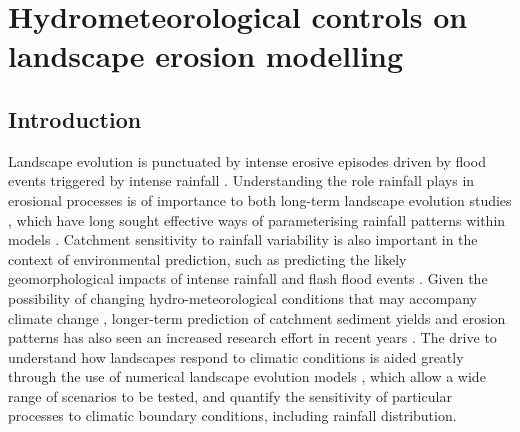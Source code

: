\chapter{Hydrometeorological controls on landscape erosion modelling}
\label{chapter_hydrogeomorph}


\section{Introduction}

Landscape evolution is punctuated by intense erosive episodes driven by flood events triggered by intense rainfall \citep{Wolman1960,newson1980geomorphological,Costa1995}. Understanding the role rainfall plays in erosional processes is of importance to both long-term landscape evolution studies \citep[e.g.][]{rinaldo1995geomorphological,tucker1997drainage,Tucker2000}, which have long sought effective ways of parameterising rainfall patterns within models \citep[e.g][]{Eagleson1978}.  Catchment sensitivity to rainfall variability is also important in the context of environmental prediction, such as predicting the likely geomorphological impacts of intense rainfall and flash flood events \citep[e.g.][]{lane2007interactions,deluis2010rainfall,milan2012geomorphic}. Given the possibility of changing hydro-meteorological conditions that may accompany climate change \citep{Kendon2014}, longer-term prediction of catchment sediment yields and erosion patterns has also seen an increased research effort in recent years \citep{coulthard2000modelling,Coulthard2012,hancock2017sediment}. The drive to understand how landscapes respond to climatic conditions is aided greatly through the use of numerical landscape evolution models \citep{Tucker2010}, which allow a wide range of scenarios to be tested, and quantify the sensitivity of particular processes to climatic boundary conditions, including rainfall distribution.

